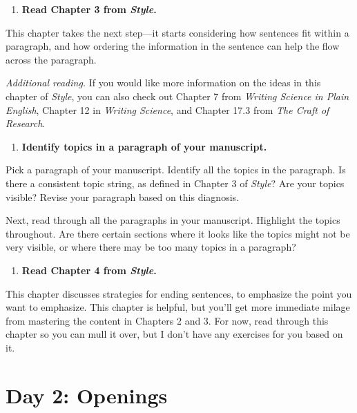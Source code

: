 \documentclass[]{tufte-book}
\providecommand{\tightlist}{%
  \setlength{\itemsep}{0pt}\setlength{\parskip}{0pt}}
\begin{document}
\begin{enumerate}
\def\labelenumi{\arabic{enumi}.}
\setcounter{enumi}{7}
\tightlist
\item
  \textbf{Read Chapter 3 from \emph{Style}.}
\end{enumerate}

This chapter takes the next step---it starts considering how sentences fit
within a paragraph, and how ordering the information in the sentence can
help the flow across the paragraph.

\emph{Additional reading.} If you would like more information on the ideas in this
chapter of \emph{Style}, you can also check out Chapter 7 from \emph{Writing Science in
Plain English}, Chapter 12 in \emph{Writing Science}, and Chapter 17.3 from
\emph{The Craft of Research}.

\begin{enumerate}
\def\labelenumi{\arabic{enumi}.}
\setcounter{enumi}{8}
\tightlist
\item
  \textbf{Identify topics in a paragraph of your manuscript.}
\end{enumerate}

Pick a paragraph of your manuscript. Identify all the topics in the paragraph.
Is there a consistent topic string, as defined in Chapter 3 of \emph{Style}?
Are your topics visible? Revise your paragraph based on this diagnosis.

Next, read through all the paragraphs in your manuscript. Highlight the topics
throughout. Are there certain sections where it looks like the topics might not
be very visible, or where there may be too many topics in a paragraph?

\begin{enumerate}
\def\labelenumi{\arabic{enumi}.}
\setcounter{enumi}{9}
\tightlist
\item
  \textbf{Read Chapter 4 from \emph{Style}.}
\end{enumerate}

This chapter discusses strategies for ending sentences, to emphasize the point
you want to emphasize. This chapter is helpful, but you'll get more immediate
milage from mastering the content in Chapters 2 and 3. For now, read through
this chapter so you can mull it over, but I don't have any exercises for you
based on it.

\hypertarget{day-2-openings}{%
\chapter{Day 2: Openings}\label{day-2-openings}}
\end{document}
